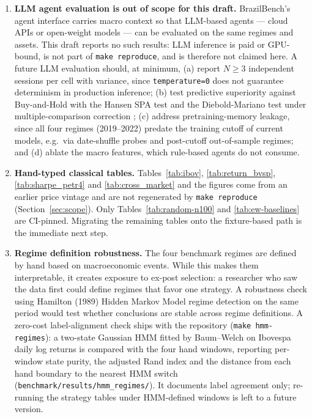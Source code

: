 \documentclass{article}
\begin{document}
\begin{enumerate}

\item \textbf{LLM agent evaluation is out of scope for this draft.}
BrazilBench's agent interface carries macro context so that LLM-based
agents --- cloud APIs or open-weight models --- can be evaluated on the
same regimes and assets. This draft reports no such results: LLM
inference is paid or GPU-bound, is not part of \texttt{make
reproduce}, and is therefore not claimed here. A future LLM
evaluation should, at minimum, (a) report $N{\geq}3$ independent
sessions per cell with variance, since \texttt{temperature=0} does
not guarantee determinism in production inference; (b) test
predictive superiority against Buy-and-Hold with the Hansen SPA test
\cite{hansen2005} and the Diebold-Mariano test \cite{dieboldmariano1995}
under multiple-comparison correction \cite{harveyliuzhu2016}; (c)
address pretraining-memory leakage, since all four regimes
(2019--2022) predate the training cutoff of current models, e.g.\ via
date-shuffle probes and post-cutoff out-of-sample regimes; and (d)
ablate the macro features, which rule-based agents do not consume.

\item \textbf{Hand-typed classical tables.} Tables~\ref{tab:ibov},
\ref{tab:return_bvsp}, \ref{tab:sharpe_petr4} and \ref{tab:cross_market}
and the figures come from an earlier price vintage and are not
regenerated by \texttt{make reproduce} (Section~\ref{sec:scope}).
Only Tables~\ref{tab:random-n100} and \ref{tab:ew-baselines} are
CI-pinned. Migrating the remaining tables onto the fixture-based
path is the immediate next step.

\item \textbf{Regime definition robustness.} The four benchmark regimes
are defined by hand based on macroeconomic events. While this makes
them interpretable, it creates exposure to ex-post selection:
a researcher who saw the data first could define regimes that favor
one strategy. A robustness check using Hamilton (1989) Hidden Markov
Model \cite{hamilton1989} regime detection on the same period would
test whether conclusions are stable across regime definitions. A
zero-cost label-alignment check ships with the repository
(\texttt{make hmm-regimes}): a two-state Gaussian HMM fitted by
Baum--Welch on Ibovespa daily log returns is compared with the four
hand windows, reporting per-window state purity, the adjusted Rand
index and the distance from each hand boundary to the nearest HMM
switch (\texttt{benchmark/results/hmm\_regimes/}). It documents label
agreement only; re-running the strategy tables under HMM-defined
windows is left to a future version.


\end{enumerate}
\end{document}
